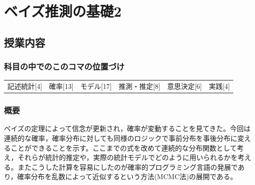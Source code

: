 \section{ベイズ推測の基礎2}
\label{lesson26}

\subsection{授業内容}
\subsubsection{科目の中でのこのコマの位置づけ}
\begin{tabular}[t]{cccccc}
    記述統計[4] & 確率[13] & モデル[17] & 推測・推定[8] & 意思決定[6] & 実践[4]
\end{tabular}

\subsubsection{概要}
ベイズの定理によって信念が更新され，確率が変動することを見てきた。今回は連続的な確率，確率分布に対しても同様のロジックで事前分布を事後分布に変えることができることを示す。ここまでの式を改めて連続的な分布関数として考え，それらが統計的推定や，実際の統計モデルでどのように用いられるかを考える。またこうした計算を容易にしたのが確率的プログラミング言語の発展であり，確率分布を乱数によって近似するという方法(MCMC法)の展開である。
